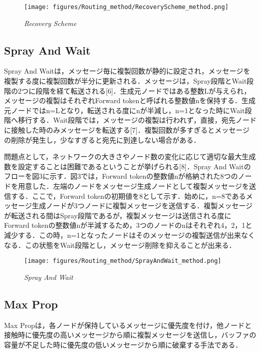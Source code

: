 \documentclass[11pt]{icsthesis}
\begin{document}
\begin{figure}[h]
	\centering
	\texttt{[image: figures/Routing\_method/RecoveryScheme\_method.png]}
	\caption[]{\it{Recovery Scheme}}
	\label{RecoveryScheme}
\end{figure}

\subsection{Spray And Wait}
Spray And Waitは，メッセージ毎に複製回数が静的に設定され，メッセージを複製する度に複製回数が半分に更新される．メッセージは，Spray段階とWait段階の2つに段階を経て転送される[6]．生成元ノードではある整数Lが与えられ，メッセージの複製はそれぞれForward tokenと呼ばれる整数値nを保持する．生成元ノードではn=Lとなり，転送される度にnが半減し，n=1となった時にWait段階へ移行する．Wait段階では，メッセージの複製は行われず，直接，宛先ノードに接触した時のみメッセージを転送する[7]．複製回数が多すぎるとメッセージの削除が発生し，少なすぎると宛先に到達しない場合がある．

問題点として，ネットワークの大きさやノード数の変化に応じて適切な最大生成数を設定することは困難であるということが挙げられる[8]．Spray And Waitのフローを図3に示す．図3では，Forward tokenの整数値nが格納された8つのノードを用意した．左端のノードをメッセージ生成ノードとして複製メッセージを送信する．ここで，Forward tokenの初期値を8として示す．始めに，n=8であるメッセージ生成ノードが3つノードに複製メッセージを送信する．複製メッセージが転送される間はSpray段階であるが，複製メッセージは送信される度にForward tokenの整数値nが半減するため，3つのノードのnはそれぞれ4，2，1と減少する．この時，n=1となったノードはそのメッセージの複製送信が出来なくなる．この状態をWait段階とし，メッセージ削除を抑えることが出来る．

\begin{figure}[h]
	\centering
	\texttt{[image: figures/Routing\_method/SprayAndWait\_method.png]}
	\caption[]{\it{Spray And Wait}}
	\label{SprayAndWait}
\end{figure}

\newpage

\subsection{Max Prop}
Max Propは，各ノードが保持しているメッセージに優先度を付け，他ノードと接触時に優先度の高いメッセージから順に複製メッセージを送信し，バッファの容量が不足した時に優先度の低いメッセージから順に破棄する手法である．
\end{document}
